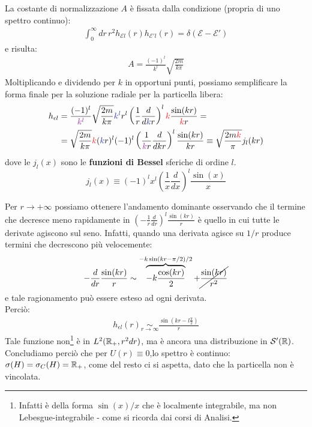 \documentclass[../../FisicaTeorica.tex]{subfiles}
\begin{document}
La costante di normalizzazione $A$ è fissata dalla condizione (propria di uno spettro continuo):
\begin{align*}
\int_0^\infty dr\, r^2 h_{\mathcal{E}l}(r) h_{\mathcal{E}'l}(r) = \delta(\mathcal{E}-\mathcal{E}')
\end{align*}
e risulta:
\begin{align*}
A=
\frac{(-1)^l}{k^l}\sqrt{\frac{2m}{k\pi}}
\end{align*}
Moltiplicando e dividendo per $k$ in opportuni punti, possiamo semplificare la forma finale per la soluzione radiale per la particella libera:
\begin{align*}
h_{\epsilon l} &= \frac{(-1)^l}{\textcolor{Purple}{k^l}}\sqrt{\frac{2m}{k\pi}} \textcolor{Blue}{k^l} r^l \left(\frac{1}{r}\frac{d}{d\textcolor{Blue}{k}r}\right)^l \textcolor{Red}{k}\frac{\sin(kr)}{\textcolor{Red}{k}r}=\\
&= \sqrt{\frac{2m}{k\pi}} \textcolor{Red}{k} (\textcolor{Blue}{k}r)^l (-1)^l \left(\frac{1}{\textcolor{Purple}{k}r}\frac{d}{dkr}\right)^l \frac{\sin(kr)}{kr} \equiv \sqrt{\frac{2m\textcolor{Red}{k}}{\pi}} j_l(kr)
\end{align*}
dove le $j_l(x)$ sono le \textbf{funzioni di Bessel} sferiche di ordine $l$.\\
\[
j_l(x) \equiv (-1)^l x^l \left(\frac{1}{x} \frac{d}{dx}\right)^l \frac{\sin(x)}{x}
\]


Per $r\to +\infty$ possiamo ottenere l'andamento dominante osservando che il termine che decresce meno rapidamente in $\left(-\frac{1}{r}\frac{d}{dr}\right)^l \frac{\sin(kr)}{r}$ è quello in cui tutte le derivate agiscono sul seno. Infatti, quando una derivata agisce su $1/r$ produce termini che decrescono più velocemente:
\begin{align*}
-\frac{d}{dr} \frac{\sin(kr)}{r} \sim \overbrace{-k\frac{\cos(kr)}{2}}^{-k\sin(kr-\pi/2)/2} + \cancel{\frac{\sin(kr)}{r^2}}
\end{align*} 
e tale ragionamento può essere esteso ad ogni derivata.\\
Perciò:
\begin{align*}
h_{\epsilon l}(r) \underset{r\to \infty}{\sim} \frac{\sin(kr - l\frac{\pi}{2})}{r}
\end{align*}
Tale funzione non\footnote{Infatti è della forma $\sin(x)/x$ che è localmente integrabile, ma non Lebesgue-integrabile - come si ricorda dai corsi di Analisi.} è in $L^2(\mathbb{R}_+, r^2 dr)$, ma è ancora una distribuzione in $\mathcal{S}'(\mathbb{R})$.\\
Concludiamo perciò che per $U(r)\equiv 0$,lo spettro è continuo: $\sigma(H)= \sigma_C(H) =\mathbb{R}_+$, come del resto ci si aspetta, dato che la particella non è vincolata.\\
\end{document}
